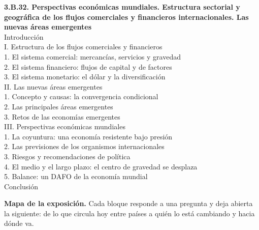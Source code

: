 \documentclass[11pt]{article}
\begin{document}
\begin{esquema}
\textbf{3.B.32. Perspectivas económicas mundiales. Estructura sectorial y geográfica de los flujos comerciales y financieros internacionales. Las nuevas áreas emergentes}\\[2pt]
Introducción\\
I. Estructura de los flujos comerciales y financieros\\
\hspace*{1.5em}1. El sistema comercial: mercancías, servicios y gravedad\\
\hspace*{1.5em}2. El sistema financiero: flujos de capital y de factores\\
\hspace*{1.5em}3. El sistema monetario: el dólar y la diversificación\\
II. Las nuevas áreas emergentes\\
\hspace*{1.5em}1. Concepto y causas: la convergencia condicional\\
\hspace*{1.5em}2. Las principales áreas emergentes\\
\hspace*{1.5em}3. Retos de las economías emergentes\\
III. Perspectivas económicas mundiales\\
\hspace*{1.5em}1. La coyuntura: una economía resistente bajo presión\\
\hspace*{1.5em}2. Las previsiones de los organismos internacionales\\
\hspace*{1.5em}3. Riesgos y recomendaciones de política\\
\hspace*{1.5em}4. El medio y el largo plazo: el centro de gravedad se desplaza\\
\hspace*{1.5em}5. Balance: un DAFO de la economía mundial\\
Conclusión
\end{esquema}

\begin{anotaciones}
\textbf{Mapa de la exposición.} Cada bloque responde a una pregunta y deja abierta la siguiente: de lo que circula hoy entre países a quién lo está cambiando y hacia dónde va.
\begin{infografiacaja}
\caption{Mapa del tema: la pregunta de cada bloque y el hilo que los une}\label{figu:mapa-tema}
\end{infografiacaja}
\end{anotaciones}
\end{document}
